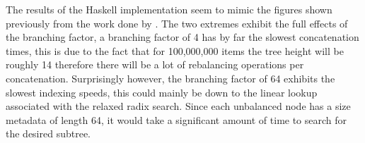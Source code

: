 \documentclass[11pt,a4paper,oneside]{article}
\begin{document}
The results of the Haskell implementation seem to mimic the figures shown previously from the work done by \cite{bagwell2011rrb}. The two extremes exhibit the full effects of the branching factor, a branching factor of 4 has by far the slowest concatenation times, this is due to the fact that for 100,000,000 items the tree height will be roughly 14 therefore there will be a lot of rebalancing operations per concatenation. Surprisingly however, the branching factor of 64 exhibits the slowest indexing speeds, this could mainly be down to the linear lookup associated with the relaxed radix search. Since each unbalanced node has a size metadata of length 64, it would take a significant amount of time to search for the desired subtree.

\pagebreak



\end{document}
